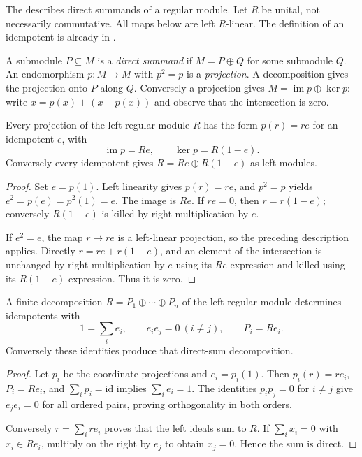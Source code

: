 The  describes direct summands of a regular module. Let $R$ be unital, not necessarily commutative. All maps below are left $R$-linear. The definition of an idempotent is already in .

\begin{definition}\label{def-direct-summand}
A submodule $P\subseteq M$ is a \emph{direct summand} if $M=P\oplus Q$ for some submodule $Q$. An endomorphism $p:M\to M$ with $p^2=p$ is a \emph{projection}. A decomposition gives the projection onto $P$ along $Q$. Conversely a projection gives $M=\operatorname{im}p\oplus\ker p$: write $x=p(x)+(x-p(x))$ and observe that the intersection is zero.
\end{definition}

\begin{theorem}\label{thm-idempotent-regular-summand}
Every projection of the left regular module $R$ has the form $p(r)=re$ for an idempotent $e$, with
\[
\operatorname{im}p=Re,\qquad \ker p=R(1-e).
\]
Conversely every idempotent gives $R=Re\oplus R(1-e)$ as left modules.
\end{theorem}
\begin{proof}\label{proof-idempotent-regular-summand}
Set $e=p(1)$. Left linearity gives $p(r)=re$, and $p^2=p$ yields $e^2=p(e)=p^2(1)=e$. The image is $Re$. If $re=0$, then $r=r(1-e)$; conversely $R(1-e)$ is killed by right multiplication by $e$.

If $e^2=e$, the map $r\mapsto re$ is a left-linear projection, so the preceding description applies. Directly $r=re+r(1-e)$, and an element of the intersection is unchanged by right multiplication by $e$ using its $Re$ expression and killed using its $R(1-e)$ expression. Thus it is zero.
\end{proof}

\begin{proposition}\label{prop-orthogonal-idempotent-family}
A finite decomposition $R=P_1\oplus\cdots\oplus P_n$ of the left regular module determines idempotents with
\[
1=\sum_i e_i,\qquad e_ie_j=0\ (i\ne j),\qquad P_i=Re_i.
\]
Conversely these identities produce that direct-sum decomposition.
\end{proposition}
\begin{proof}\label{proof-orthogonal-idempotent-family}
Let $p_i$ be the coordinate projections and $e_i=p_i(1)$. Then $p_i(r)=re_i$, $P_i=Re_i$, and $\sum_i p_i=\mathrm{id}$ implies $\sum_i e_i=1$. The identities $p_ip_j=0$ for $i\ne j$ give $e_je_i=0$ for all ordered pairs, proving orthogonality in both orders.

Conversely $r=\sum_i re_i$ proves that the left ideals sum to $R$. If $\sum_i x_i=0$ with $x_i\in Re_i$, multiply on the right by $e_j$ to obtain $x_j=0$. Hence the sum is direct.
\end{proof}

